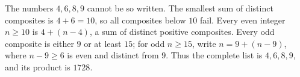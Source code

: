 The numbers $4,6,8,9$ cannot be so written. The smallest sum of distinct composites is $4+6=10$, so all composites below $10$ fail. Every even integer $n\ge10$ is $4+(n-4)$, a sum of distinct positive composites. Every odd composite is either $9$ or at least $15$; for odd $n\ge15$, write $n=9+(n-9)$, where $n-9\ge6$ is even and distinct from $9$. Thus the complete list is $4,6,8,9$, and its product is $\boxed{1728}$.
